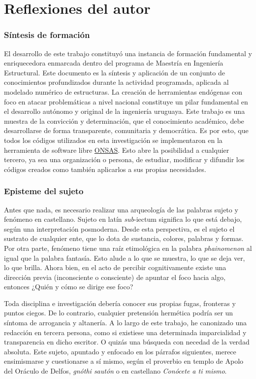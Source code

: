 \chapter{Reflexiones del autor}\label{Ape3}
\subsection*{Síntesis de formación}
El desarrollo de este trabajo constituyó una instancia de formación fundamental y enriquecedora enmarcada dentro del programa de Maestría en Ingeniería Estructural. Este documento es la síntesis y aplicación de un conjunto de conocimientos profundizados durante la actividad programada, aplicada al modelado numérico de estructuras. La creación de herramientas endógenas con foco en atacar problemáticas a nivel nacional constituye un pilar fundamental en el desarrollo autónomo y original de la ingeniería uruguaya. Este trabajo es una muestra de la convicción y determinación, que el conocimiento académico, debe desarrollarse de forma transparente, comunitaria y democrática. Es por esto, que todos los códigos utilizados en esta investigación se implementaron en la herramienta de software libre \href{https://github.com/ONSAS/ONSAS.m/}{ONSAS}. Esto abre la posibilidad a cualquier tercero, ya sea una organización o persona, de estudiar, modificar y difundir los códigos creados como también aplicarlos a sus propias necesidades. 
\subsection*{Episteme del sujeto}
Antes que nada, es necesario realizar una arqueología de las palabras sujeto y fenómeno en castellano. Sujeto en latín \emph{sub}-{iectum} significa lo que está debajo, según una interpretación posmoderna. Desde esta perspectiva, es el sujeto el sustrato de cualquier ente, que lo dota de sustancia, colores, palabras y formas. Por otra parte, fenómeno tiene una raíz etimológica en la palabra \emph{phainomenon} al igual que la palabra fantasía. Esto alude a lo que se muestra, lo que se deja ver, lo que brilla. Ahora bien, en el acto de percibir cognitivamente existe una dirección previa (inconsciente o consciente) de apuntar el foco hacia algo, entonces ¿Quién y cómo se dirige ese foco?

Toda disciplina e investigación debería conocer sus propias fugas, fronteras y puntos ciegos. De lo contrario, cualquier pretensión hermética podría ser un síntoma de arrogancia y altanería.  A lo largo de este trabajo, he canonizado una redacción en tercera persona, como si existiese una determinada imparcialidad y transparencia en dicho escritor. O quizás una búsqueda con necedad de la verdad absoluta. Este sujeto, apuntado y enfocado en los párrafos siguientes, merece ensimismarse y cuestionarse a sí mismo, según el proverbio en templo de Apolo del Oráculo de Delfos, \emph{gnóthi sautón} o en castellano \emph{Conócete a ti mismo}.

